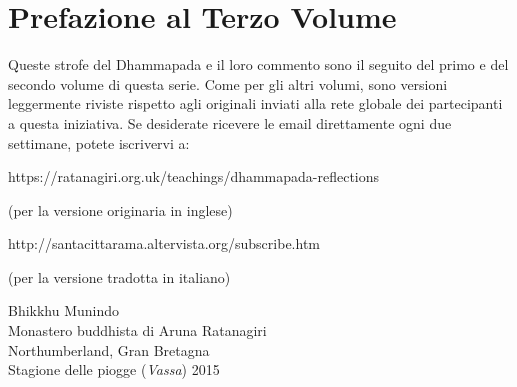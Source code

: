 \chapter{Prefazione al Terzo Volume}

Queste strofe del Dhammapada e il loro commento sono il seguito del
primo e del secondo volume di questa serie. Come per gli altri volumi,
sono versioni leggermente riviste rispetto agli originali inviati alla
rete globale dei partecipanti a questa iniziativa. Se desiderate
ricevere le email direttamente ogni due settimane, potete iscrivervi a:

\bigskip

\noindent
https://ratanagiri.org.uk/teachings/dhammapada-reflections

(per la versione originaria in inglese)

\noindent
http://santacittarama.altervista.org/subscribe.htm

(per la versione tradotta in italiano)

\bigskip

{\par\raggedleft
Bhikkhu Munindo\\
Monastero buddhista di Aruna Ratanagiri\\
Northumberland, Gran Bretagna\\
Stagione delle piogge (\emph{Vassa}) 2015
\par}
